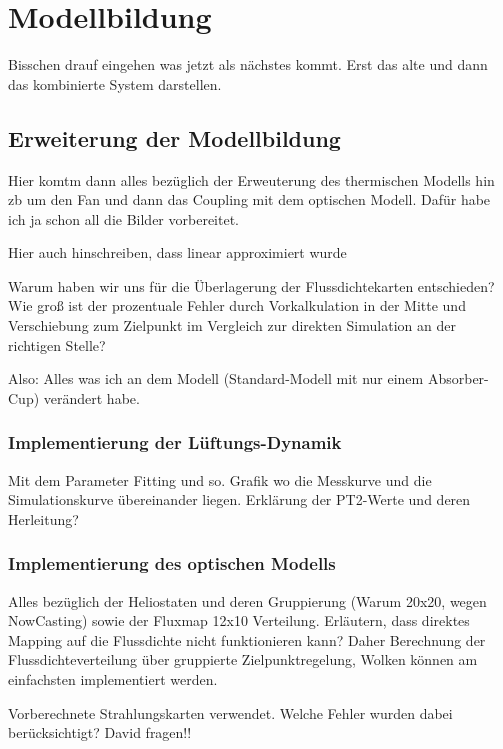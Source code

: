 \chapter{Modellbildung} \label{ch_Modellbildung}
Bisschen drauf eingehen was jetzt als nächstes kommt.
Erst das alte und dann das kombinierte System darstellen.



\section{Erweiterung der Modellbildung} \label{sec_ErweiterungModellbildung}
Hier komtm dann alles bezüglich der Erweuterung des thermischen Modells hin zb um den Fan und dann das Coupling mit dem optischen Modell.
Dafür habe ich ja schon all die Bilder vorbereitet.


Hier auch hinschreiben, dass linear approximiert wurde

Warum haben wir uns für die Überlagerung der Flussdichtekarten entschieden?
Wie groß ist der prozentuale Fehler durch Vorkalkulation in der Mitte und Verschiebung zum Zielpunkt im Vergleich zur direkten Simulation an der richtigen Stelle?

Also: Alles was ich an dem Modell (Standard-Modell mit nur einem Absorber-Cup) verändert habe.

\subsection{Implementierung der Lüftungs-Dynamik} \label{subsec_ImplementierungFan}
Mit dem Parameter Fitting und so.
Grafik wo die Messkurve und die Simulationskurve übereinander liegen.
Erklärung der PT2-Werte und deren Herleitung?

\subsection{Implementierung des optischen Modells} \label{subsec_Modells}
Alles bezüglich der Heliostaten und deren Gruppierung (Warum 20x20, wegen NowCasting) sowie der Fluxmap 12x10 Verteilung.
Erläutern, dass direktes Mapping auf die Flussdichte nicht funktionieren kann?
Daher Berechnung der Flussdichteverteilung über gruppierte Zielpunktregelung, Wolken können am einfachsten implementiert werden.

Vorberechnete Strahlungskarten verwendet.
Welche Fehler wurden dabei berücksichtigt? David fragen!!